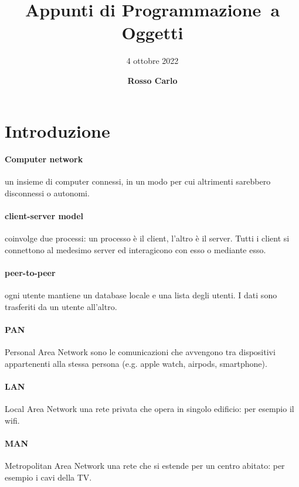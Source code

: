 \documentclass{article}
\title{\vspace{2cm}\textbf{Appunti di Programmazione\ a Oggetti}}
\author{\vspace{3mm}4 ottobre 2022}
\date{\vspace{3mm} \textbf{Rosso Carlo}}
\begin{document}
\begin{titlepage}
	\maketitle
	\thispagestyle{empty}
\end{titlepage}
\tableofcontents
\newpage

\section{Introduzione}
\paragraph{Computer network} un insieme di computer connessi, in un modo per cui
altrimenti sarebbero disconnessi o autonomi.

\paragraph{client-server model} coinvolge due processi: un processo è il client,
l'altro è il server. Tutti i client si connettono al medesimo server ed
interagicono con esso o mediante esso.
 
\paragraph{peer-to-peer} ogni utente mantiene un database locale e una lista
degli utenti. I dati sono trasferiti da un utente all'altro.

\paragraph{PAN} Personal Area Network sono le comunicazioni che avvengono tra
dispositivi appartenenti alla stessa persona (e.g. apple watch, airpods,
smartphone).

\paragraph{LAN} Local Area Network una rete privata che opera in singolo
edificio: per esempio il wifi.

\paragraph{MAN} Metropolitan Area Network una rete che si estende per un centro
abitato: per esempio i cavi della TV.
\end{document}
